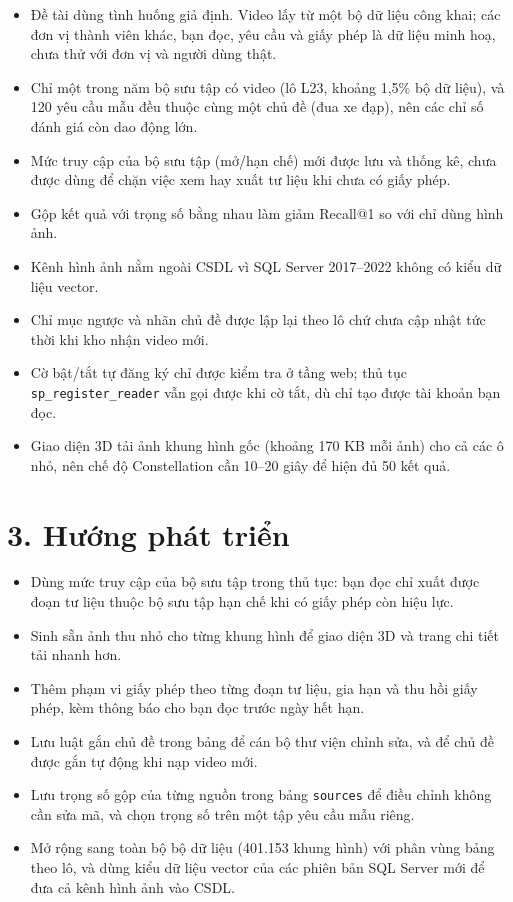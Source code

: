 \begin{itemize}
    \item Đề tài dùng tình huống giả định. Video lấy từ một bộ dữ liệu công khai; các đơn vị
    thành viên khác, bạn đọc, yêu cầu và giấy phép là dữ liệu minh hoạ, chưa thử với đơn vị và
    người dùng thật.
    \item Chỉ một trong năm bộ sưu tập có video (lô L23, khoảng 1,5\% bộ dữ liệu), và 120 yêu
    cầu mẫu đều thuộc cùng một chủ đề (đua xe đạp), nên các chỉ số đánh giá còn dao động lớn.
    \item Mức truy cập của bộ sưu tập (mở/hạn chế) mới được lưu và thống kê, chưa được dùng để
    chặn việc xem hay xuất tư liệu khi chưa có giấy phép.
    \item Gộp kết quả với trọng số bằng nhau làm giảm Recall@1 so với chỉ dùng hình ảnh.
    \item Kênh hình ảnh nằm ngoài CSDL vì SQL Server 2017--2022 không có kiểu dữ liệu vector.
    \item Chỉ mục ngược và nhãn chủ đề được lập lại theo lô chứ chưa cập nhật tức thời khi kho
    nhận video mới.
    \item Cờ bật/tắt tự đăng ký chỉ được kiểm tra ở tầng web; thủ tục
    \texttt{sp\_register\_reader} vẫn gọi được khi cờ tắt, dù chỉ tạo được tài khoản bạn đọc.
    \item Giao diện 3D tải ảnh khung hình gốc (khoảng 170 KB mỗi ảnh) cho cả các ô nhỏ, nên chế
    độ Constellation cần 10--20 giây để hiện đủ 50 kết quả.
\end{itemize}

\section*{3. Hướng phát triển}

\begin{itemize}
    \item Dùng mức truy cập của bộ sưu tập trong thủ tục: bạn đọc chỉ xuất được đoạn tư liệu
    thuộc bộ sưu tập hạn chế khi có giấy phép còn hiệu lực.
    \item Sinh sẵn ảnh thu nhỏ cho từng khung hình để giao diện 3D và trang chi tiết tải nhanh
    hơn.
    \item Thêm phạm vi giấy phép theo từng đoạn tư liệu, gia hạn và thu hồi giấy phép, kèm
    thông báo cho bạn đọc trước ngày hết hạn.
    \item Lưu luật gắn chủ đề trong bảng để cán bộ thư viện chỉnh sửa, và để chủ đề được gắn
    tự động khi nạp video mới.
    \item Lưu trọng số gộp của từng nguồn trong bảng \texttt{sources} để điều chỉnh không cần
    sửa mã, và chọn trọng số trên một tập yêu cầu mẫu riêng.
    \item Mở rộng sang toàn bộ bộ dữ liệu (401.153 khung hình) với phân vùng bảng theo lô, và
    dùng kiểu dữ liệu vector của các phiên bản SQL Server mới để đưa cả kênh hình ảnh vào CSDL.
\end{itemize}
